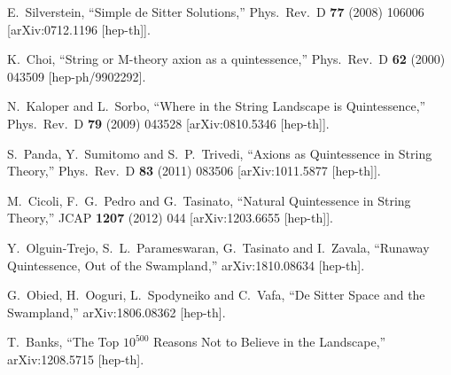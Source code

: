 \documentclass[11pt,a4paper]{article}
\begin{document}
\begin{thebibliography}{99}
  E.~Silverstein,
  ``Simple de Sitter Solutions,''
  Phys.\ Rev.\ D {\bf 77} (2008) 106006
  [arXiv:0712.1196 [hep-th]].


  K.~Choi,
  ``String or M-theory axion as a quintessence,''
  Phys.\ Rev.\ D {\bf 62} (2000) 043509
  [hep-ph/9902292].


  N.~Kaloper and L.~Sorbo,
  ``Where in the String Landscape is Quintessence,''
  Phys.\ Rev.\ D {\bf 79} (2009) 043528
  [arXiv:0810.5346 [hep-th]].


  S.~Panda, Y.~Sumitomo and S.~P.~Trivedi,
  ``Axions as Quintessence in String Theory,''
  Phys.\ Rev.\ D {\bf 83} (2011) 083506
  [arXiv:1011.5877 [hep-th]].
  

  
  M.~Cicoli, F.~G.~Pedro and G.~Tasinato,
  ``Natural Quintessence in String Theory,''
  JCAP {\bf 1207} (2012) 044
  [arXiv:1203.6655 [hep-th]].  

  
  Y.~Olguin-Trejo, S.~L.~Parameswaran, G.~Tasinato and I.~Zavala,
  ``Runaway Quintessence, Out of the Swampland,''
  arXiv:1810.08634 [hep-th].
  
  


  G.~Obied, H.~Ooguri, L.~Spodyneiko and C.~Vafa,
  ``De Sitter Space and the Swampland,''
  arXiv:1806.08362 [hep-th].


  T.~Banks,
  ``The Top $10^{500}$ Reasons Not to Believe in the Landscape,''
  arXiv:1208.5715 [hep-th].



\end{thebibliography}
\end{document}
